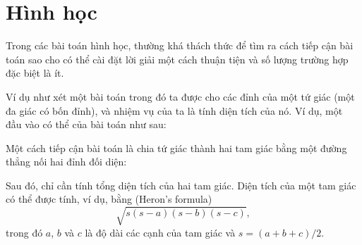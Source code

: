 \chapter{Hình học}


Trong các bài toán hình học, thường khá thách thức
để tìm ra cách tiếp cận bài toán sao cho
có thể cài đặt lời giải một cách thuận tiện
và số lượng trường hợp đặc biệt là ít.

Ví dụ như xét một bài toán trong đó
ta được cho các đỉnh của một tứ giác
(một đa giác có bốn đỉnh),
và nhiệm vụ của ta là tính diện tích của nó.
Ví dụ, một đầu vào có thể của bài toán như sau:

\begin{center}
\end{center}
Một cách tiếp cận bài toán là chia
tứ giác thành hai tam giác bằng một đường
thẳng nối hai đỉnh đối diện:
\begin{center}
\end{center}
Sau đó, chỉ cần tính tổng diện tích
của hai tam giác.
Diện tích của một tam giác có thể được tính,
ví dụ, bằng  (Heron's formula)
\[ \sqrt{s (s-a) (s-b) (s-c)},\]
trong đó $a$, $b$ và $c$ là độ dài
các cạnh của tam giác và
$s=(a+b+c)/2$.

